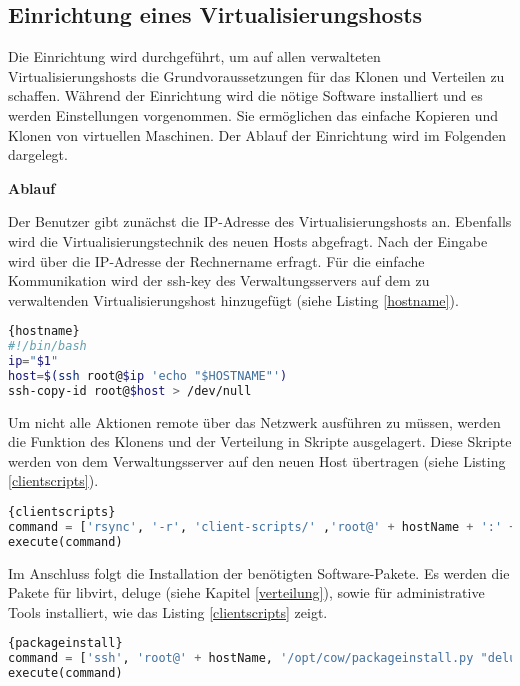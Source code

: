 \subsection{Einrichtung eines Virtualisierungshosts}\label{einrichtung}
Die Einrichtung wird durchgeführt, um auf allen verwalteten Virtualisierungshosts die Grundvoraussetzungen für das Klonen und Verteilen zu schaffen. Während der Einrichtung wird die nötige Software installiert und es werden Einstellungen vorgenommen. Sie ermöglichen das einfache Kopieren und Klonen von virtuellen Maschinen. Der Ablauf der Einrichtung wird im Folgenden dargelegt. 

\textbf{Ablauf}

Der Benutzer gibt zunächst die IP-Adresse des Virtualisierungshosts an. Ebenfalls wird die Virtualisierungstechnik des neuen Hosts abgefragt. Nach der Eingabe wird über die IP-Adresse der Rechnername erfragt. Für die einfache Kommunikation wird der ssh-key des Verwaltungsservers auf dem zu verwaltenden Virtualisierungshost hinzugefügt (siehe Listing \ref{hostname}).
\\
\begin{lstlisting}[caption=Abruf des Rechnernamens und Kopieren des ssh-keys (hostname.sh),language=Bash,label=hostname]{hostname}
#!/bin/bash
ip="$1"
host=$(ssh root@$ip 'echo "$HOSTNAME"')
ssh-copy-id root@$host > /dev/null
\end{lstlisting}

Um nicht alle Aktionen remote über das Netzwerk ausführen zu müssen, werden die Funktion des Klonens und der Verteilung in Skripte ausgelagert. Diese Skripte werden von dem Verwaltungsserver auf den neuen Host übertragen (siehe Listing \ref{clientscripts}).
\\
\begin{lstlisting}[caption=Übertragung der Client-Skripte (cow.py),language=Python,label=clientscripts]{clientscripts}
command = ['rsync', '-r', 'client-scripts/' ,'root@' + hostName + ':' + binDir]
execute(command)
\end{lstlisting}

Im Anschluss folgt die Installation der benötigten Software-Pakete. Es werden die Pakete für libvirt, deluge (siehe Kapitel \ref{verteilung}), sowie für administrative Tools installiert, wie das Listing \ref{clientscripts} zeigt. 
\\
\begin{lstlisting}[caption=Paketinstallation auf dem Virtualisierungsserver (cow.py),language=Python,label=packageinstall]{packageinstall}
command = ['ssh', 'root@' + hostName, '/opt/cow/packageinstall.py "deluged deluge-console mktorrent libvirt-bin python-libvirt"' ]
execute(command)
\end{lstlisting}

